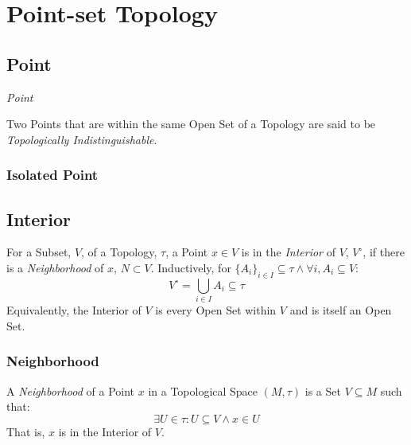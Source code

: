 \section{Point-set Topology}\label{sec:point_set}

\subsection{Point}\label{sec:topological_point}

\emph{Point}

Two Points that are within the same Open Set of a Topology are said to
be \emph{Topologically Indistinguishable}.



\subsubsection{Isolated Point}\label{sec:isolated_point}



\subsection{Interior}\label{sec:interior}

For a Subset, $V$, of a Topology, $\tau$, a Point $x \in V$ is in the
\emph{Interior} of $V$, $V^{\circ}$, if there is a \emph{Neighborhood}
of $x$, $N \subset V$. Inductively, for $\{A_i\}_{i \in I} \subseteq
\tau \wedge \forall i, A_i \subseteq V$:
\[
    V^{\circ} = \bigcup_{i \in I} A_i \subseteq \tau
\]
Equivalently, the Interior of $V$ is every Open Set within $V$ and is
itself an Open Set.



\subsubsection{Neighborhood}\label{sec:neighborhood}

A \emph{Neighborhood} of a Point $x$ in a Topological Space $(M,\tau)$
is a Set $V \subseteq M$ such that:
\[
    \exists U \in \tau : U \subseteq V \wedge x \in U
\]
That is, $x$ is in the Interior of $V$.



